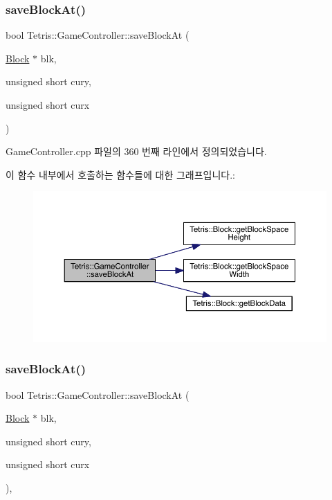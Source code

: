 \subsubsection{\texorpdfstring{save\+Block\+At()}{saveBlockAt()}\hspace{0.1cm}{\footnotesize\ttfamily [1/2]}}
{\footnotesize\ttfamily bool Tetris\+::\+Game\+Controller\+::save\+Block\+At (\begin{DoxyParamCaption}\item[{\hyperlink{class_tetris_1_1_block}{Block} $\ast$}]{blk,  }\item[{unsigned short}]{cury,  }\item[{unsigned short}]{curx }\end{DoxyParamCaption})\hspace{0.3cm}{\ttfamily [protected]}}



Game\+Controller.\+cpp 파일의 360 번째 라인에서 정의되었습니다.

이 함수 내부에서 호출하는 함수들에 대한 그래프입니다.\+:
\nopagebreak
\begin{figure}[H]
\begin{center}
\leavevmode
\includegraphics[width=350pt]{class_tetris_1_1_game_controller_adc067380df0f0da4ea4a358d00d6a123_cgraph}
\end{center}
\end{figure}
\mbox{\label{class_tetris_1_1_game_controller_adc067380df0f0da4ea4a358d00d6a123}} 
\subsubsection{\texorpdfstring{save\+Block\+At()}{saveBlockAt()}\hspace{0.1cm}{\footnotesize\ttfamily [2/2]}}
{\footnotesize\ttfamily bool Tetris\+::\+Game\+Controller\+::save\+Block\+At (\begin{DoxyParamCaption}\item[{\hyperlink{class_tetris_1_1_block}{Block} $\ast$}]{blk,  }\item[{unsigned short}]{cury,  }\item[{unsigned short}]{curx }\end{DoxyParamCaption})\hspace{0.3cm}{\ttfamily [inline]}, {\ttfamily [protected]}}


